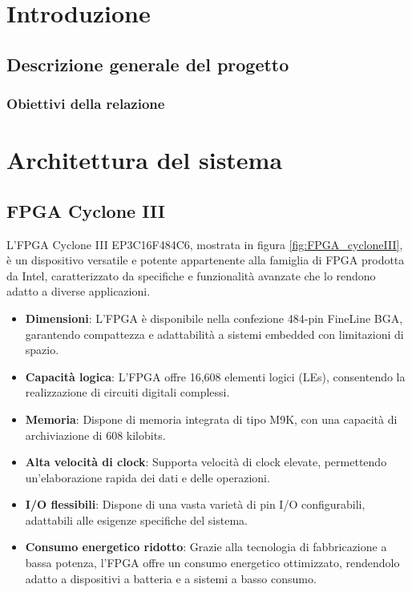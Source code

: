 \documentclass[titlepage]{report}
\begin{document}
  
\setlength{\parskip}{\baselineskip} 

\begin{frontespizio}
\end{frontespizio}
\tableofcontents
\newpage


\chapter*{Introduzione}
\label{ch:intro}

	\section{Descrizione generale del progetto}
	\label{sec:desc_generale}
		\subsection{Obiettivi della relazione}
		\label{subsec:obiettivi}

\chapter*{Architettura del sistema}
\label{ch:architettura}

	\section{FPGA Cyclone III}
	\label{sec:fpga}
		L'FPGA Cyclone III EP3C16F484C6, mostrata in figura \ref{fig:FPGA_cycloneIII}, è un dispositivo versatile e potente appartenente alla famiglia di FPGA prodotta da Intel, caratterizzato da specifiche e funzionalità avanzate che lo rendono adatto a diverse applicazioni.

		\begin{itemize}
			\item \textbf{Dimensioni}: L'FPGA è disponibile nella confezione 484-pin FineLine BGA, garantendo compattezza e adattabilità a sistemi embedded con limitazioni di spazio.
			\item \textbf{Capacità logica}: L'FPGA offre 16,608 elementi logici (LEs), consentendo la realizzazione di circuiti digitali complessi.
			\item \textbf{Memoria}: Dispone di memoria integrata di tipo M9K, con una capacità di archiviazione di 608 kilobits.
			\item \textbf{Alta velocità di clock}: Supporta velocità di clock elevate, permettendo un'elaborazione rapida dei dati e delle operazioni.
			\item \textbf{I/O flessibili}: Dispone di una vasta varietà di pin I/O configurabili, adattabili alle esigenze specifiche del sistema.
			\item \textbf{Consumo energetico ridotto}: Grazie alla tecnologia di fabbricazione a bassa potenza, l'FPGA offre un consumo energetico ottimizzato, rendendolo adatto a dispositivi a batteria e a sistemi a basso consumo.
		\end{itemize}
		
\end{document}
